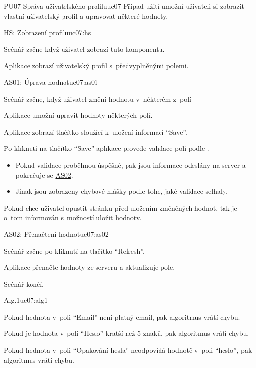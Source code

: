 \begin{usecase}{PU07 Správa uživatelského profilu}{uc07}
    Případ užití umožní uživateli si zobrazit vlastní uživatelský profil a upravovat některé hodnoty.

    \begin{scenario}{HS: Zobrazení profilu}{uc07:hs}
        \item Scénář začne když uživatel zobrazí tuto komponentu.
        \item Aplikace zobrazí uživatelský profil s~předvyplněnými polemi.
    \end{scenario}

    \begin{scenario}{AS01: Úprava hodnot}{uc07:as01}
        \item Scénář začne, když uživatel změní hodnotu v~některém z~polí.
        \item Aplikace umožní upravit hodnoty některých polí.
        \item Aplikace zobrazí tlačítko sloužící k~uložení informací \enquote{Save}.
        \item Po kliknutí na tlačítko \enquote{Save} aplikace provede validace polí podle .
        \begin{itemize}
            \item Pokud validace proběhnou úspěšně, pak jsou informace odeslány na server a pokračuje se \hyperref[uc07:as02]{AS02}.
            \item Jinak jsou zobrazeny chybové hlášky podle toho, jaké validace selhaly.
        \end{itemize}
        \item Pokud chce uživatel opustit stránku před uložením změněných hodnot, tak je o~tom informován s~možností uložit hodnoty.
    \end{scenario}

    \begin{scenario}{AS02: Přenačtení hodnot}{uc07:as02}
        \item Scénář začne po kliknutí na tlačítko \enquote{Refresh}.
        \item Aplikace přenačte hodnoty ze serveru a aktualizuje pole.
        \item Scénář končí.
    \end{scenario}

    \begin{scenario}{Alg.1}{uc07:alg1}
        \item Pokud hodnota v~poli \enquote{Email} není platný email, pak algoritmus vrátí chybu.
        \item Pokud je hodnota v~poli \enquote{Heslo} kratší než 5 znaků, pak algoritmus vrátí chybu.
        \item Pokud hodnota v~poli \enquote{Opakování hesla} neodpovídá hodnotě v~poli \enquote{heslo}, pak algoritmus vrátí chybu.
    \end{scenario}
\end{usecase}